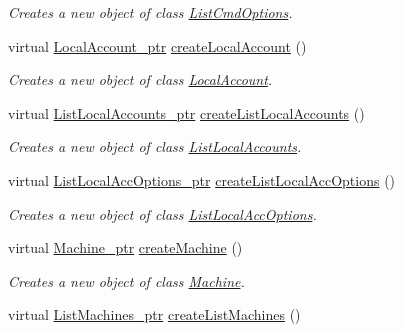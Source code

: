 \begin{DoxyCompactItemize}
\begin{DoxyCompactList}\small\item\em Creates a new object of class \hyperlink{classUMS__Data_1_1ListCmdOptions}{ListCmdOptions}. \item\end{DoxyCompactList}\item 
virtual \hyperlink{classUMS__Data_1_1LocalAccount}{LocalAccount\_\-ptr} \hyperlink{classUMS__Data_1_1UMS__DataFactory_a05236e57c61ea1e957b7aadb2849d32e}{createLocalAccount} ()
\begin{DoxyCompactList}\small\item\em Creates a new object of class \hyperlink{classUMS__Data_1_1LocalAccount}{LocalAccount}. \item\end{DoxyCompactList}\item 
virtual \hyperlink{classUMS__Data_1_1ListLocalAccounts}{ListLocalAccounts\_\-ptr} \hyperlink{classUMS__Data_1_1UMS__DataFactory_ab6e10df2a4d6afb98148f6db96d73bcc}{createListLocalAccounts} ()
\begin{DoxyCompactList}\small\item\em Creates a new object of class \hyperlink{classUMS__Data_1_1ListLocalAccounts}{ListLocalAccounts}. \item\end{DoxyCompactList}\item 
virtual \hyperlink{classUMS__Data_1_1ListLocalAccOptions}{ListLocalAccOptions\_\-ptr} \hyperlink{classUMS__Data_1_1UMS__DataFactory_a569be73efd394099ab103e102356c4fd}{createListLocalAccOptions} ()
\begin{DoxyCompactList}\small\item\em Creates a new object of class \hyperlink{classUMS__Data_1_1ListLocalAccOptions}{ListLocalAccOptions}. \item\end{DoxyCompactList}\item 
virtual \hyperlink{classUMS__Data_1_1Machine}{Machine\_\-ptr} \hyperlink{classUMS__Data_1_1UMS__DataFactory_a1808faf2218decb95a48fad71ec91a5f}{createMachine} ()
\begin{DoxyCompactList}\small\item\em Creates a new object of class \hyperlink{classUMS__Data_1_1Machine}{Machine}. \item\end{DoxyCompactList}\item 
virtual \hyperlink{classUMS__Data_1_1ListMachines}{ListMachines\_\-ptr} \hyperlink{classUMS__Data_1_1UMS__DataFactory_a6088c81b4bcacebdbfd5a62b18732239}{createListMachines} ()

\end{DoxyCompactItemize}
